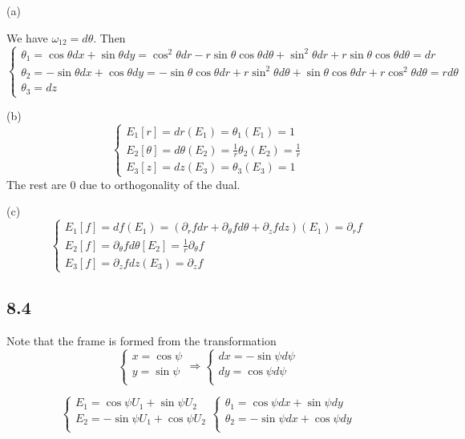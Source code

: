 \documentclass[12pt]{article}
\begin{document}
(a)

We have $\omega_{12} = d\theta$.  Then $$
\begin{cases}
	\theta_1 = \cos\theta dx + \sin\theta dy = \cos^2\theta dr-r\sin\theta\cos\theta d\theta + \sin^2\theta dr + r\sin\theta\cos\theta d\theta  = dr  \\
	\theta_2 = -\sin\theta dx + \cos\theta dy = -\sin\theta\cos\theta dr +r\sin^2\theta d\theta +\sin\theta\cos\theta dr + r\cos^2\theta d\theta = rd\theta \\
	\theta_3 = dz 
\end{cases}
$$

(b)
$$
\begin{cases}
	E_1[r] = dr(E_1) = \theta_1(E_1) = 1 \\
	E_2[\theta] = d\theta(E_2) = \frac{1}{r}\theta_2(E_2) = \frac{1}{r} \\
	E_3[z] = dz(E_3) = \theta_3(E_3) = 1  
\end{cases}
$$
The rest are 0 due to orthogonality of the dual. 

(c)
$$
\begin{cases}
	E_1[f] = df(E_1) = (\partial_r f dr + \partial_\theta f d\theta + \partial_z f dz)(E_1) = \partial_r f\\
	E_2[f] = \partial_\theta f d\theta[E_2] = \frac{1}{r}\partial_\theta f \\
	E_3[f] = \partial_z f dz(E_3) = \partial_z f
\end{cases}
$$

\subsection*{8.4}
 Note that the frame is formed from the transformation
$$ \begin{cases}
	x = \cos\psi \\
	y= \sin \psi  \\
\end{cases}
\Rightarrow
\begin{cases}
	dx = -\sin\psi d\psi \\
	dy = \cos\psi d\psi \\
\end{cases}
$$

$$
\begin{cases}
  E_1 = \cos\psi U_1 + \sin\psi U_2 \\
  E_2 = -\sin\psi U_1 + \cos\psi U_2 \\
\end{cases}
\begin{cases}
	\theta_1 = \cos\psi dx + \sin\psi dy \\
	\theta_2 = -\sin\psi dx + \cos\psi dy \\
\end{cases}$$
\end{document}
